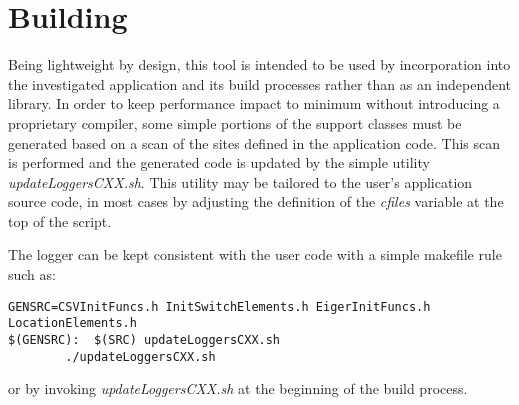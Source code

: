 
\section{Building}\label{sec:build}
Being lightweight by design, this tool is intended to be used by incorporation into the investigated application and its build processes rather than as an independent library.  In order to keep performance impact to minimum without introducing a proprietary compiler, some simple portions of the support classes must be generated based on a scan of the sites defined in the application code. This scan is performed and the generated code is updated by the simple utility {\em updateLoggersCXX.sh}. This utility may be tailored to the user's application source code, in most cases by adjusting the definition of the {\em cfiles} variable at the top of the script.

The logger can be kept consistent with the user code with a simple makefile rule such as:
\begin{verbatim}
GENSRC=CSVInitFuncs.h InitSwitchElements.h EigerInitFuncs.h LocationElements.h
$(GENSRC):  $(SRC) updateLoggersCXX.sh
        ./updateLoggersCXX.sh
\end{verbatim}
or by invoking {\em updateLoggersCXX.sh} at the beginning of the build process.



